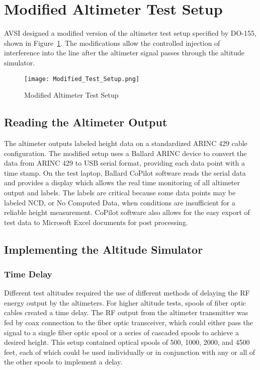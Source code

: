 \section{Modified Altimeter Test Setup} 
AVSI designed a modified version of the altimeter test setup specified by DO-155, shown in Figure~\ref{fig:Modified Testbed}. The modifications allow the controlled injection of interference into the line after the altimeter signal passes  through the altitude simulator. 

\begin{figure}[ht]
\centering
\texttt{[image: Modified\_Test\_Setup.png]}
\caption[]{Modified Altimeter Test Setup}

\label{fig:Modified Testbed}

\end{figure}
\subsection{Reading the Altimeter Output}
The altimeter outputs labeled height data on a standardized ARINC 429 cable configuration. The modified setup uses a Ballard ARINC device to convert the data from ARINC 429 to USB serial format, providing each data point with a time stamp. On the test laptop, Ballard CoPilot software reads the serial data and provides a display which allows the real time monitoring of all altimeter output and labels. The labels are critical because some data points may be labeled NCD, or No Computed Data, when conditions are insufficient for a reliable height measurement. CoPilot software also allows for the easy export of test data to Microsoft Excel documents for post processing. 
\subsection{Implementing the Altitude Simulator}
\subsubsection{Time Delay}
Different test altitudes required the use of different methods of delaying the RF energy output by the altimeters. For higher altitude tests, spools of fiber optic cables created a time delay. The RF output from the altimeter transmitter was fed by coax connection to the fiber optic transceiver, which could either pass the signal to a single fiber optic spool or a series of cascaded spools to achieve a desired height. This setup contained optical spools of 500, 1000, 2000, and 4500 feet, each of which could be used individually or in conjunction with any or all of the other spools to implement a delay.

